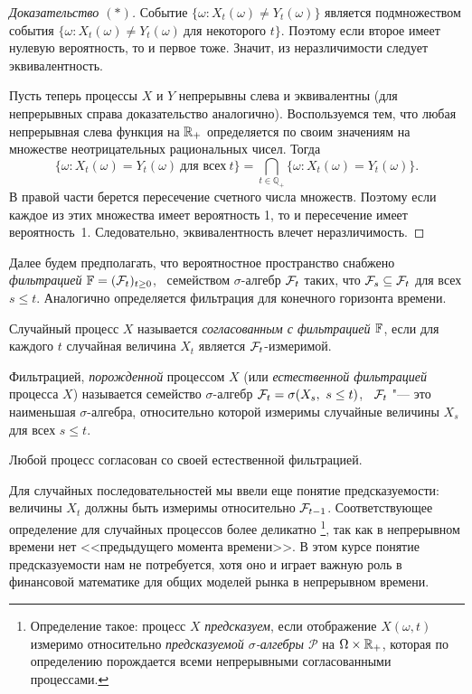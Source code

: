 \begin{proof}[Доказательство $(*)$]
Событие $\{\omega: X_t(\omega) \neq Y_t(\omega)\}$ является подмножеством события $\{\omega: X_t(\omega) \neq Y_t(\omega)\ \text{для некоторого $t$}\}$.
Поэтому если второе имеет нулевую вероятность, то и первое тоже.
Значит, из неразличимости следует эквивалентность.

Пусть теперь процессы $X$ и $Y$ непрерывны слева и эквивалентны (для непрерывных справа доказательство аналогично).
Воспользуемся тем, что любая непрерывная слева функция на $\mathbb{R}_+$ определяется по своим значениям на множестве неотрицательных рациональных чисел.
Тогда
\[
\{\omega: X_t(\omega) = Y_t(\omega)\ \text{для всех}\ t\}
= \bigcap_{t\in\mathbb{Q}_+} \{\omega: X_t(\omega) = Y_t(\omega)\}.
\]
В правой части берется пересечение счетного числа множеств.
Поэтому если каждое из этих множества имеет вероятность 1, то и пересечение имеет вероятность~1.
Следовательно, эквивалентность влечет неразличимость.
\end{proof}

Далее будем предполагать, что вероятностное пространство снабжено \emph{фильтрацией} $\mathbb{F}=(\mathcal{F}_t)_{t\ge0}$, \te\ семейством $\sigma$-алгебр $\mathcal{F}_t$ таких, что $\mathcal{F}_s \subseteq \mathcal{F}_t$ для всех $s\le t$.
Аналогично определяется фильтрация для конечного горизонта времени. 

\begin{definition}
Случайный процесс $X$ называется \emph{согласованным с фильтрацией $\mathbb{F}$}, если для каждого $t$ случайная величина $X_t$ является $\mathcal{F}_t$-измеримой.
\end{definition}

\begin{definition}
Фильтрацией, \emph{порожденной} процессом $X$ (или \emph{естественной фильтрацией} процесса $X$) называется семейство $\sigma$-алгебр $\mathcal{F}_t = \sigma(X_s,\ s\le t)$, \te\ $\mathcal{F}_t$ "--- это наименьшая $\sigma$-алгебра, относительно которой измеримы случайные величины $X_s$ для всех $s \le t$.
\end{definition}

\begin{remark}
Любой процесс согласован со своей естественной фильтрацией.
\end{remark}

\begin{remark}[$*$]
Для случайных последовательностей мы ввели еще понятие предсказуемости: величины $X_t$ должны быть измеримы относительно $\mathcal{F}_{t-1}$.
Соответствующее определение для случайных процессов более деликатно%
\footnote{Определение такое: процесс $X$ \emph{предсказуем}, если отображение $X(\omega,t)$ измеримо относительно \emph{предсказуемой $\sigma$-алгебры $\mathcal{P}$} на $\Omega\times\mathbb{R}_+$, которая по определению порождается всеми непрерывными согласованными процессами.},
так как в непрерывном времени нет <<предыдущего момента времени>>.
В этом курсе понятие предсказуемости нам не потребуется, хотя оно и играет важную роль в финансовой математике для общих моделей рынка в непрерывном времени.
\end{remark}


